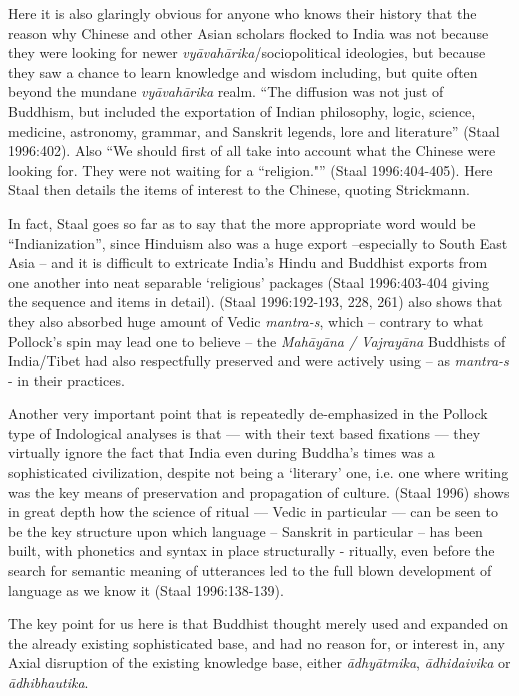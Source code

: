 Here it is also glaringly obvious for anyone who knows their history that the reason why Chinese and other Asian scholars flocked to India was not because they were looking for newer \textit{vyāvahārika}/sociopolitical ideologies, but because they saw a chance to learn knowledge and wisdom including, but quite often beyond the mundane \textit{vyāvahārika} realm. “The diffusion was not just of Buddhism, but included the exportation of Indian philosophy, logic, science, medicine, astronomy, grammar, and Sanskrit legends, lore and literature” (Staal 1996:402). Also “We should first of all take into account what the Chinese were looking for. They were not waiting for a ``religion."” (Staal 1996:404-405). Here Staal then details the items of interest to the Chinese, quoting Strickmann.

In fact, Staal goes so far as to say that the more appropriate word would be “Indianization”, since Hinduism also was a huge export –especially to South East Asia – and it is difficult to extricate India’s Hindu and Buddhist exports from one another into neat separable ‘religious’ packages (Staal 1996:403-404 giving the sequence and items in detail). (Staal 1996:192-193, 228, 261) also shows that they also absorbed huge amount of Vedic \textit{mantra-s}, which – contrary to what Pollock’s spin may lead one to believe – the \textit{Mahāyāna / Vajrayāna} Buddhists of India/Tibet had also respectfully preserved and were actively using – as \textit{mantra-s} - in their practices.

Another very important point that is repeatedly de-emphasized in the Pollock type of Indological analyses is that --- with their text based fixations --- they virtually ignore the fact that India even during Buddha’s times was a sophisticated civilization, despite not being a ‘literary’ one, i.e. one where writing was the key means of preservation and propagation of culture. (Staal 1996) shows in great depth how the science of ritual --- Vedic in particular --- can be seen to be the key structure upon which language – Sanskrit in particular – has been built, with phonetics and syntax in place structurally - ritually, even before the search for semantic meaning of utterances led to the full blown development of language as we know it (Staal 1996:138-139).

The key point for us here is that Buddhist thought merely used and expanded on the already existing sophisticated base, and had no reason for, or interest in, any Axial disruption of the existing knowledge base, either \textit{ādhyātmika}, \textit{ādhidaivika} or \textit{ādhibhautika}.

